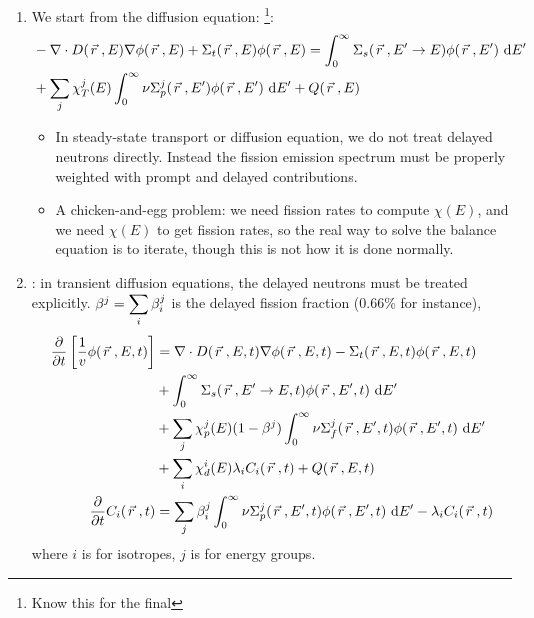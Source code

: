 \documentclass{school-22.211-notes}
\begin{document}
\clearpage
{}
\begin{enumerate}
\item We start from the diffusion equation: \footnote{Know this for the final}: 
\small
\begin{align}
& - \nabla \cdot D(\left.\vec{r}\right., E) \nabla \phi(\left.\vec{r}\right., E) + \Sigma_t (\left.\vec{r}\right., E) \phi(\left.\vec{r}\right., E) = \int_0^{\infty} \Sigma_s (\left.\vec{r}\right., E'\to E) \phi(\left.\vec{r}\right., E') \mbox{ }\mathrm{d} E' \\
&+ \displaystyle\sum_j \chi_T^j (E) \int_0^{\infty} \nu \Sigma_p^j (\left.\vec{r}\right., E') \phi(\left.\vec{r}\right., E') \mbox{ }\mathrm{d} E' + Q(\left.\vec{r}\right., E) 
\end{align}
\normalsize
\begin{itemize}
\item In steady-state transport or diffusion equation, we do not treat delayed neutrons directly. Instead the fission emission spectrum must be properly weighted with prompt and delayed contributions. 

\item A chicken-and-egg problem: we need fission rates to compute $\chi(E)$, and we need $\chi(E)$ to get fission rates, so the real way to solve the balance equation is to iterate, though this is not how it is done normally.
\end{itemize}


\item {}: in transient diffusion equations, the delayed neutrons must be treated explicitly. $\beta^j = \displaystyle\sum_i \beta_i^j$ is the delayed fission fraction (0.66\% for instance), 
  \begin{align}
    \frac{\partial}{\partial t} \left[ \frac{1}{v} \phi(\left.\vec{r}\right., E, t) \right] &= \nabla \cdot D(\left.\vec{r}\right., E, t) \nabla \phi(\left.\vec{r}\right., E, t) - \Sigma_t (\left.\vec{r}\right., E, t) \phi(\left.\vec{r}\right., E, t) 
\notag \\
    & + \int_0^{\infty} \Sigma_s (\left.\vec{r}\right., E'\to E, t) \phi(\left.\vec{r}\right., E', t) \mbox{ }\mathrm{d} E'\notag \\
    &+ \displaystyle\sum_j \chi_p^j (E) (1-\beta^j) \int_0^{\infty} \nu \Sigma_f^j (\left.\vec{r}\right., E', t) \phi(\left.\vec{r}\right., E', t) \mbox{ }\mathrm{d} E'\notag \\
    &+ \displaystyle\sum_i \chi_d^i (E) \lambda_i C_i (\left.\vec{r}\right., t) + Q(\left.\vec{r}\right., E, t)\\
    \frac{\partial}{\partial t} C_i (\left.\vec{r}\right., t) &= \displaystyle\sum_j \beta_i^j \int_0^{\infty} \nu \Sigma_p^j (\left.\vec{r}\right., E', t) \phi(\left.\vec{r}\right., E', t) \mbox{ }\mathrm{d} E'  - \lambda_i C_i (\left.\vec{r}\right., t) 
  \end{align}
  where $i$ is for isotropes, $j$ is for energy groups. 


\end{enumerate}
\end{document}
